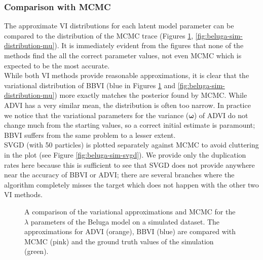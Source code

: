 \subsubsection{Comparison with MCMC}
The approximate VI distributions for each latent model parameter can be compared to the distribution of the MCMC trace (Figures \ref{fig:beluga-sim-distribution-lambda}, \ref{fig:beluga-sim-distribution-mu}). It is immediately evident from the figures that none of the methods find the all the correct parameter values, not even MCMC which is expected to be the most accurate.
\\
While both VI methods provide reasonable approximations, it is clear that the variational distribution of BBVI (blue in Figures \ref{fig:beluga-sim-distribution-lambda} and \ref{fig:beluga-sim-distribution-mu}) more exactly matches the posterior found by MCMC. While ADVI has a very similar mean, the distribution is often too narrow. In practice we notice that the variational parameters for the variance ($\bm\omega$) of ADVI do not change much from the starting values, so a correct initial estimate is paramount; BBVI suffers from the same problem to a lesser extent.
\\
SVGD (with 50 particles) is plotted separately against MCMC to avoid cluttering in the plot (see Figure \ref{fig:beluga-sim-svgd}). We provide only the duplication rates here because this is sufficient to see that SVGD does not provide anywhere near the accuracy of BBVI or ADVI; there are several branches where the algorithm completely misses the target which does not happen with the other two VI methods.



\begin{figure}
    \noindent{}
	\caption[Beluga simulation: VI approximation and MCMC comparison]{A comparison of the variational approximations and MCMC for the $\lambda$ parameters of the Beluga model on a simulated dataset. The approximations for ADVI (orange), BBVI (blue) are compared with MCMC (pink) and the ground truth values of the simulation (green).}
    \label{fig:beluga-sim-distribution-lambda}
\end{figure}

